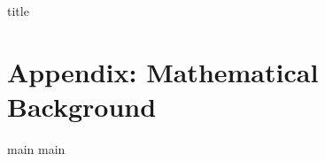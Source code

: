 \documentclass[oneside,11pt,openany,titlepage]{book}
\newlength{\lmarginparwidth}
\newlength{\thinrulethickness}
\renewcommand{\thechapter}{\arabic{chapter}}
\renewcommand{\thesection}{\thechapter.\arabic{section}}
\renewcommand{\thesubsection}{\thesection-\arabic{subsection}}
\let\originalchapter=\chapter
\renewcommand{\chapter}[1]{%
    \originalchapter{#1}
    \titleformat{\section}[display]{\large\bfseries}{}{0pt}{\titlerule[\thinrulethickness]\vspace{3pt}\thesection\quad}
    \titleformat{\subsection}[runin]{\bfseries\itshape}{\makebox[\lmarginparwidth][l]{\thesubsection}}{0pt}{}
    \titlespacing*{\subsection}{-\lmarginparwidth}{*3}{0pt}
    \renewcommand{\thesection}{\thechapter.\arabic{section}}
    \fancyhead[LO]{\nouppercase{\footnotesize\textit{\rightmark}}}
}
\theoremstyle{clrs}
\begin{document}
    \setlength{\mathindent}{0pt}
    \setlength{\abovedisplayskip}{1ex}

    \frontmatter

    {title}

    \ifpdf
    \fi

    \tableofcontents

    \mainmatter

    \setcounter{part}{7}
    \part{Appendix: Mathematical Background}

    \appendix
    {main}
    {main}

    \backmatter

    \let\chapter=\originalchapter
    \titleformat{\chapter}{\normalfont\color{accentcolor}\Large}{}{0pt}{}
    \titlespacing*{\chapter}{0pt}{0pt}{1.5in}
    
    {\footnotesize}
    \nocite{*}
\end{document}
